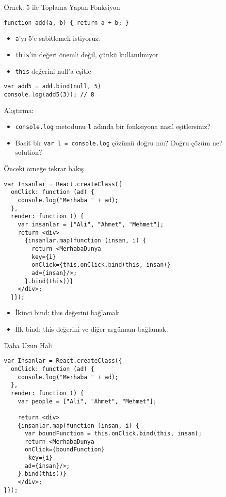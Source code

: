 \documentclass[presentation]{beamer}
\begin{document}
\begin{frame}[fragile,label=sec-14]{Örnek: 5 ile Toplama Yapan Fonksiyon}
 \begin{verbatim}
function add(a, b) { return a + b; }
\end{verbatim}

\begin{itemize}
\item \texttt{a}'yı 5'e sabitlemek istiyoruz.
\item \texttt{this}'in değeri önemli değil, çünkü kullanılmıyor
\item \texttt{this} değerini null'a eşitle
\end{itemize}

\begin{verbatim}
var add5 = add.bind(null, 5)
console.log(add5(3)); // 8
\end{verbatim}
\end{frame}


\begin{frame}[fragile,label=sec-15]{Alıştırma:}
 \begin{itemize}
\item \texttt{console.log} metodunu \texttt{l} adında bir fonksiyona nasıl eşitlersiniz?
\item Basit bir \verb~var l = console.log~ çözümü doğru mu? Doğru çözüm ne?
solution?
\end{itemize}
\end{frame}

\begin{frame}[fragile,label=sec-16]{Önceki örneğe tekrar bakış}
 \begin{verbatim}
var Insanlar = React.createClass({
  onClick: function (ad) {
    console.log("Merhaba " + ad);
  },
  render: function () {
    var insanlar = ["Ali", "Ahmet", "Mehmet"];
    return <div>
      {insanlar.map(function (insan, i) {
        return <MerhabaDunya
        key={i}
        onClick={this.onClick.bind(this, insan)}
        ad={insan}/>;
      }.bind(this))}
    </div>;
  }});
\end{verbatim}

\begin{itemize}
\item İkinci bind: this değerini bağlamak.
\item İlk bind: this değerini ve diğer argümanı bağlamak.
\end{itemize}
\end{frame}

\begin{frame}[fragile,label=sec-17]{Daha Uzun Hali}
 \begin{verbatim}
var Insanlar = React.createClass({
  onClick: function (ad) {
    console.log("Merhaba " + ad);
  },
  render: function () {
    var people = ["Ali", "Ahmet", "Mehmet"];

    return <div>
    {insanlar.map(function (insan, i) {
      var boundFunction = this.onClick.bind(this, insan);
      return <MerhabaDunya
      onClick={boundFunction}
       key={i}
      ad={insan}/>;
    }.bind(this))}
    </div>;
}});
\end{verbatim}
\end{frame}
\end{document}
